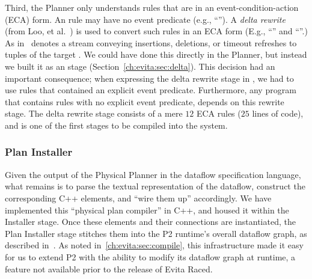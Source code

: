
Third, the Planner only understands rules that are in an event-condition-action
(ECA) form.  An \OVERLOG rule may have no event predicate (e.g., ``'').  A {\em delta rewrite} (from Loo, et
al.~\cite{loo-sigmod06}) is used to convert such rules in an ECA form (E.g.,
``'' and ``''.) As in~\cite{loo-sigmod06}  denotes a
stream conveying insertions, deletions, or timeout refreshes to tuples of the
target .  We could have done this directly in the Planner, but
instead we built it as an \OVERLOG stage (Section~\ref{ch:evita:sec:delta}).
This decision had an important consequence; when expressing the delta rewrite
stage in \OVERLOG, we had to use rules that contained an explicit event
predicate.  Furthermore, any \OVERLOG program that contains rules with no
explicit event predicate, depends on this rewrite stage.  The delta rewrite
\OVERLOG stage consists of a mere $12$ ECA rules ($25$ lines of code), and is
one of the first \OVERLOG stages to be compiled into the system.
 

\subsubsection{Plan Installer}
\label{ch:evita:sec:installer}

Given the output of the Physical Planner in the dataflow specification
language, what remains is to parse the textual representation of the dataflow,
construct the corresponding C++ elements, and ``wire them up'' accordingly.  We
have implemented this ``physical plan compiler'' in C++, and housed it within
the Installer stage.  Once these elements and their connections are
instantiated, the Plan Installer stage stitches them into the P2 runtime's
overall dataflow graph, as described in~\cite{p2:sosp}.  As noted
in~\ref{ch:evita:sec:compile}, this infrastructure made it easy for us to
extend P2 with the ability to modify its dataflow graph at runtime, a feature
not available prior to the release of Evita Raced.

